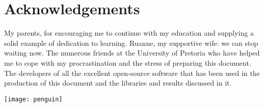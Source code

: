 \chapter*{Acknowledgements}

My parents, for encouraging me to continue with my education and supplying a solid example of dedication to learning.
Ruanne, my supportive wife: we can stop waiting now.
The numerous friends at the University of Pretoria who have helped me to cope with my procrastination and the stress of preparing this document.
The developers of all the excellent open-source software that has been used in the production of this document and the libraries and results discussed in it.

\vfil

\begin{flushright}
  \texttt{[image: penguin]} 
\end{flushright}

